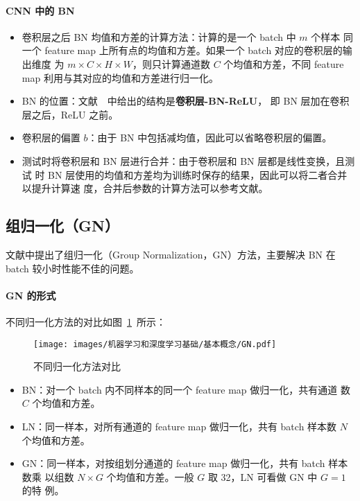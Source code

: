 \paragraph{CNN 中的 BN}
\begin{itemize}
  \item 卷积层之后 BN 均值和方差的计算方法：计算的是一个 batch 中 $m$ 个样本
    同一个 feature map 上所有点的均值和方差。如果一个 batch 对应的卷积层的输出维度
    为 $m \times C \times H \times W$，则只计算通道数 $C$ 个均值和方差，不同
    feature map 利用与其对应的均值和方差进行归一化。
  \item BN 的位置：文献~~中给出的结构是\textbf{卷积层-BN-ReLU}，
    即 BN 层加在卷积层之后，ReLU 之前。
  \item 卷积层的偏置 $b$：由于 BN 中包括减均值，因此可以省略卷积层的偏置。
  \item 测试时将卷积层和 BN 层进行合并：由于卷积层和 BN 层都是线性变换，且测试
    时 BN 层使用的均值和方差均为训练时保存的结果，因此可以将二者合并以提升计算速
    度，合并后参数的计算方法可以参考文献。
\end{itemize}

\subsection{组归一化（GN）}
\label{sub:GN}

文献中提出了组归一化（Group Normalization，GN）方法，主要解决 BN
在 batch 较小时性能不佳的问题。

\paragraph{GN 的形式}
不同归一化方法的对比如图~\ref{fig:all-norm}~所示：
\begin{figure}[ht]
  \centering
  \texttt{[image: images/机器学习和深度学习基础/基本概念/GN.pdf]}
  \caption{不同归一化方法对比}
  \label{fig:all-norm}
\end{figure}

\begin{itemize}
  \item BN：对一个 batch 内不同样本的同一个 feature map 做归一化，共有通道
    数 $C$ 个均值和方差。
  \item LN：同一样本，对所有通道的 feature map 做归一化，共有 batch 样本数 $N$
    个均值和方差。
  \item GN：同一样本，对按组划分通道的 feature map 做归一化，共有 batch 样本数乘
    以组数 $N \times G$ 个均值和方差。一般 $G$ 取 32，LN 可看做 GN 中 $G=1$ 的特
    例。
\end{itemize}

